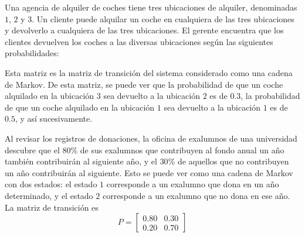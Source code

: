 \begin{example}\label{exam:markov1}
    Una agencia de alquiler de coches tiene tres ubicaciones de alquiler, denominadas $1$, $2$ y $3$. Un cliente puede alquilar un coche en cualquiera de las tres ubicaciones y devolverlo a cualquiera de las tres ubicaciones. El gerente encuentra que los clientes devuelven los coches a las diversas ubicaciones según las siguientes probabilidades:\newpage
    \begin{nscenter}
    \end{nscenter}
    Esta matriz es la matriz de transición del sistema considerado como una cadena de Markov. De esta matriz, se puede ver que la probabilidad de que un coche alquilado en la ubicación $3$ sea devuelto a la ubicación $2$ es de $0.3$, la probabilidad de que un coche alquilado en la ubicación $1$ sea devuelto a la ubicación $1$ es de $0.5$, y así sucesivamente.
\end{example}

\begin{example}\label{exam:markov2}
    Al revisar los registros de donaciones, la oficina de exalumnos de una universidad descubre que el $80\%$ de sus exalumnos que contribuyen al fondo anual un año también contribuirán al siguiente año, y el $30\%$ de aquellos que no contribuyen un año contribuirán al siguiente. Esto se puede ver como una cadena de Markov con dos estados: el estado $1$ corresponde a un exalumno que dona en un año determinado, y el estado $2$ corresponde a un exalumno que no dona en ese año. La matriz de transición es
    $$P = \begin{bmatrix}
        0.80 & 0.30 \\
        0.20 & 0.70
    \end{bmatrix}$$
\end{example}

